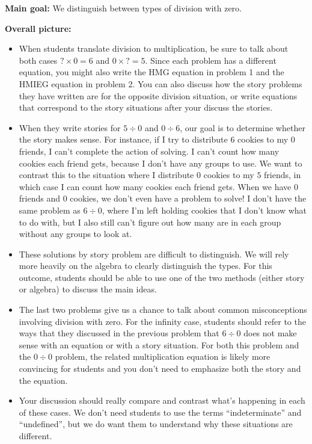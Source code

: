 \documentclass[nooutcomes,noauthor]{ximera}
\begin{document}
\newpage

\begin{instructorNotes} 



{\bf Main goal:} We distinguish between types of division with zero.


{\bf Overall picture:} 



\begin{itemize}
	\item When students translate division to multiplication, be sure to talk about both cases $? \times 0 = 6$ and $0 \times ? = 5$. Since each problem has a different equation, you might also write the HMG equation in problem 1 and the HMIEG equation in problem 2. You can also discuss how the story problems they have written are for the opposite division situation, or write equations that correspond to the story situations after your discuss the stories.
	\item When they write stories for $5 \div 0$ and $0 \div 6$, our goal is to determine whether the story makes sense. For instance, if I try to distribute $6$ cookies to my $0$ friends, I can't complete the action of solving. I can't count how many cookies each friend gets, because I don't have any groups to use. We want to contrast this to the situation where I distribute $0$ cookies to my $5$ friends, in which case I can count how many cookies each friend gets. When we have $0$ friends and $0$ cookies, we don't even have a problem to solve! I don't have the same problem as $6 \div 0$, where I'm left holding cookies that I don't know what to do with, but I also still can't figure out how many are in each group without any groups to look at.
	\item These solutions by story problem are difficult to distinguish. We will rely more heavily on the algebra to clearly distinguish the types. For this outcome, students should be able to use one of the two methods (either story or algebra) to discuss the main ideas.
	\item The last two problems give us a chance to talk about common misconceptions involving division with zero. For the infinity case, students should refer to the ways that they discussed in the previous problem that $6 \div 0$ does not make sense with an equation or with a story situation. For both this problem and the $0 \div 0$ problem, the related multiplication equation is likely more convincing for students and you don't need to emphasize both the story and the equation.
	\item Your discussion should really compare and contrast what's happening in each of these cases. We don't need students to use the terms ``indeterminate'' and ``undefined'', but we do want them to understand why these situations are different.
\end{itemize}



\end{instructorNotes}
\end{document}
